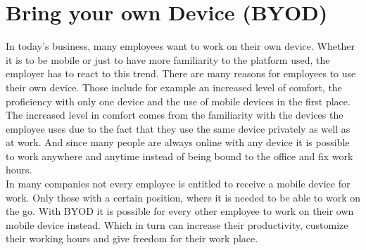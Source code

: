 \chapter{Bring your own Device (BYOD)}
In today's business, many employees want to work on their own device. Whether it is to be mobile or just to have more familiarity to the platform used, the employer has to react to this trend. There are many reasons for employees to use their own device. Those include for example an increased level of comfort, the proficiency with only one device and the use of mobile devices in the first place. \\
The increased level in comfort comes from the familiarity with the devices the employee uses due to the fact that they use the same device privately as well as at work. And since many people are always online with any device it is possible to work anywhere and anytime instead of being bound to the office and fix work hours. \\
In many companies not every employee is entitled to receive a mobile device for work. Only those with a certain position, where it is needed to be able to work on the go. With BYOD it is possible for every other employee to work on their own mobile device instead. Which in turn can increase their productivity, customize their working hours and give freedom for their work place.\\


